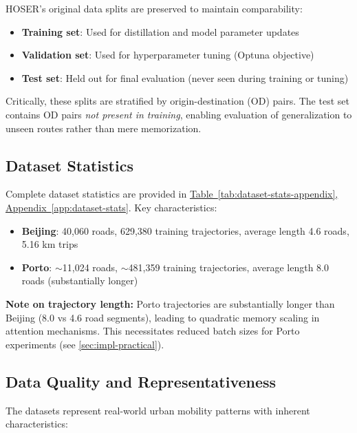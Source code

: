 HOSER's original data splits are preserved to maintain comparability:

\begin{itemize}[noitemsep,topsep=0pt]
    \item \textbf{Training set}: Used for distillation and model parameter updates
    \item \textbf{Validation set}: Used for hyperparameter tuning (Optuna objective)
    \item \textbf{Test set}: Held out for final evaluation (never seen during training or tuning)
\end{itemize}

Critically, these splits are stratified by origin-destination (OD) pairs. The test set contains OD pairs \emph{not present in training}, enabling evaluation of generalization to unseen routes rather than mere memorization.

\subsection{Dataset Statistics}
\label{sec:data-stats}

Complete dataset statistics are provided in \hyperref[app:dataset-stats]{Table~\ref*{tab:dataset-stats-appendix}, Appendix~\ref*{app:dataset-stats}}. Key characteristics:

\begin{itemize}[noitemsep,topsep=0pt]
    \item \textbf{Beijing}: 40,060 roads, 629,380 training trajectories, average length 4.6 roads, 5.16 km trips
    \item \textbf{Porto}: $\sim$11,024 roads, $\sim$481,359 training trajectories, average length 8.0 roads (substantially longer)
\end{itemize}

\textbf{Note on trajectory length:} Porto trajectories are substantially longer than Beijing (8.0 vs 4.6 road segments), leading to quadratic memory scaling in attention mechanisms. This necessitates reduced batch sizes for Porto experiments (see \autoref{sec:impl-practical}).

\subsection{Data Quality and Representativeness}
\label{sec:data-quality}

The datasets represent real-world urban mobility patterns with inherent characteristics:

